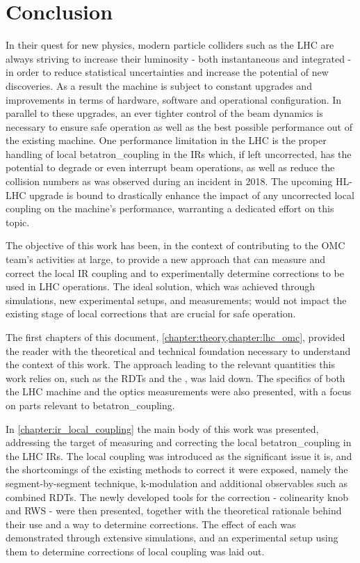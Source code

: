 \chapter{Conclusion}
\label{chapter:conclusion}

In their quest for new physics, modern particle colliders such as the \gls{LHC} are always striving to increase their \gls{luminosity} - both instantaneous and integrated - in order to reduce statistical uncertainties and increase the potential of new discoveries.
As a result the machine is subject to constant upgrades and improvements in terms of hardware, software and operational configuration.
In parallel to these upgrades, an ever tighter control of the \gls{beam} dynamics is necessary to ensure safe operation as well as the best possible performance out of the existing machine.
One performance limitation in the \gls{LHC} is the proper handling of local \gls{betatron_coupling} in the \glspl{IR} which, if left uncorrected, has the potential to degrade or even interrupt beam operations, as well as reduce the collision numbers as was observed during an incident in \num{2018}.
The upcoming \gls{HL-LHC} upgrade is bound to drastically enhance the impact of any uncorrected local coupling on the machine's performance, warranting a dedicated effort on this topic.

The objective of this work has been, in the context of contributing to the \gls{OMC} team's activities at large, to provide a new approach that can measure and correct the local \gls{IR} coupling and to experimentally determine corrections to be used in LHC operations.
The ideal solution, which was achieved through simulations, new experimental setups, and measurements; would not impact the existing stage of local corrections that are crucial for safe operation.
\break 

The first chapters of this document, \cref{chapter:theory,chapter:lhc_omc}, provided the reader with the theoretical and technical foundation necessary to understand the context of this work.
The approach leading to the relevant quantities this work relies on, such as the \glspl{RDT} and the , was laid down.
The specifics of both the \gls{LHC} machine and the \gls{optics} measurements were also presented, with a focus on parts relevant to \gls{betatron_coupling}.
\break 

In \cref{chapter:ir_local_coupling} the main body of this work was presented, addressing the target of measuring and correcting the local \gls{betatron_coupling} in the LHC \glspl{IR}.
The local coupling was introduced as the significant issue it is, and the shortcomings of the existing methods to correct it were exposed, namely the segment-by-segment technique, k-modulation and additional observables such as combined \glspl{RDT}.
The newly developed tools for the correction - colinearity \gls{knob} and \gls{RWS} - were then presented, together with the theoretical rationale behind their use and a way to determine corrections.
The effect of each was demonstrated through extensive simulations, and an experimental setup using them to determine corrections of local coupling was laid out.


